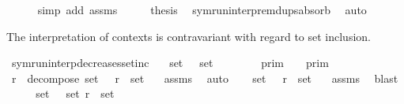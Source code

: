 \begin{isabellebody}
\ \ \ \ \isamarkupfalse%
\ {\isacharparenleft}simp\ add{\isacharcolon}\ assms{\isacharparenright}\isanewline
\ \ \isamarkupfalse%
\ \isamarkupfalse%
\ {\isacharquery}thesis\ \isamarkupfalse%
\ symrun{\isacharunderscore}interp{\isacharunderscore}remdups{\isacharunderscore}absorb\ \isamarkupfalse%
\ auto\isanewline
{}\isamarkupfalse%
%
\endisatagproof
{\isafoldproof}%
%
\isadelimproof
%
\endisadelimproof
%
\begin{isamarkuptext}%
The interpretation of contexts is contravariant with regard to set inclusion.%
\end{isamarkuptext}\isamarkuptrue%
\isamarkupfalse%
\ symrun{\isacharunderscore}interp{\isacharunderscore}decreases{\isacharunderscore}setinc{\isacharcolon}\isanewline
\ \ \ {\isacartoucheopen}set\ {\isasymGamma}\ {\isasymsubseteq}\ set\ {\isasymGamma}{\isacharprime}{\isacartoucheclose}\isanewline
\ \ \ \ \ {\isacartoucheopen}{\isasymlbrakk}{\isasymlbrakk}\ {\isasymGamma}\ {\isasymrbrakk}{\isasymrbrakk}\isactrlsub p\isactrlsub r\isactrlsub i\isactrlsub m\ {\isasymsupseteq}\ {\isasymlbrakk}{\isasymlbrakk}\ {\isasymGamma}{\isacharprime}\ {\isasymrbrakk}{\isasymrbrakk}\isactrlsub p\isactrlsub r\isactrlsub i\isactrlsub m{\isacartoucheclose}\isanewline
%
\isadelimproof
%
\endisadelimproof
%
\isatagproof
{}\isamarkupfalse%
\ {\isacharminus}\isanewline
\ \ \isamarkupfalse%
\ {\isasymGamma}\isactrlsub r\ \ decompose{\isacharcolon}\ {\isacartoucheopen}set\ {\isacharparenleft}{\isasymGamma}\ {\isacharat}\ {\isasymGamma}\isactrlsub r{\isacharparenright}\ {\isacharequal}\ set\ {\isasymGamma}{\isacharprime}{\isacartoucheclose}\ \isamarkupfalse%
\ assms\ \isamarkupfalse%
\ auto\isanewline
\ \ \isamarkupfalse%
\ {\isacartoucheopen}set\ {\isacharparenleft}{\isasymGamma}\ {\isacharat}\ {\isasymGamma}\isactrlsub r{\isacharparenright}\ {\isacharequal}\ set\ {\isasymGamma}{\isacharprime}{\isacartoucheclose}\ \isamarkupfalse%
\ assms\ \isamarkupfalse%
\ blast\isanewline
\ \ \isamarkupfalse%
\ \isamarkupfalse%
\ {\isacartoucheopen}{\isacharparenleft}set\ {\isasymGamma}{\isacharparenright}\ {\isasymunion}\ {\isacharparenleft}set\ {\isasymGamma}\isactrlsub r{\isacharparenright}\ {\isacharequal}\ set\ {\isasymGamma}{\isacharprime}{\isacartoucheclose}\ \isamarkupfalse%

\end{isabellebody}
